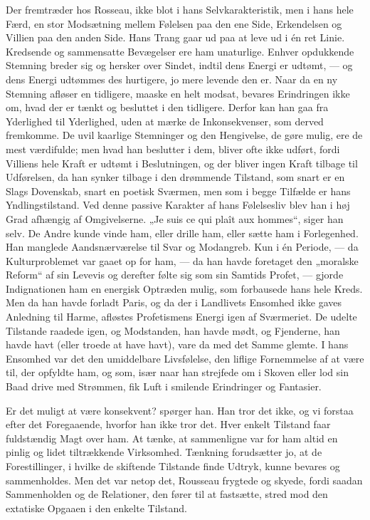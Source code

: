 \documentclass[12pt,a4paper,openany]{book}
\newcommand{\opage}[1]{\marginnote{\footnotesize\textit{[#1]}}}
\begin{document}
Der fremtræder hos Rosseau, ikke blot i hans Selvkarakteristik,
men i hans hele Færd, en stor Modsætning mellem
Følelsen paa den ene Side, Erkendelsen og Villien paa den
anden Side. Hans Trang gaar ud paa at leve ud i én ret
Linie. Kredsende og sammensatte Bevægelser ere ham unaturlige.
Enhver opdukkende Stemning breder sig og hersker over
Sindet, indtil dens Energi er udtømt, --- og dens Energi udtømmes
des hurtigere, jo mere levende den er. Naar da en ny
Stemning afløser en tidligere, maaske en helt modsat, bevares
Erindringen ikke om, hvad der er tænkt og besluttet i den tidligere.
Derfor kan han gaa fra Yderlighed til Yderlighed, uden
at mærke de Inkonsekvenser, som derved fremkomme. De uvil%
\setcounter{footnote}{0}%
\opage{143}kaarlige Stemninger og den Hengivelse, de gøre mulig, ere de
mest værdifulde; men hvad han beslutter i dem, bliver ofte ikke
udført, fordi Villiens hele Kraft er udtømt i Beslutningen, og
der bliver ingen Kraft tilbage til Udførelsen, da han synker tilbage
i den drømmende Tilstand, som snart er en Slags Dovenskab,
snart en poetisk Sværmen, men som i begge Tilfælde er
hans Yndlingstilstand. Ved denne passive Karakter af hans Følelsesliv
blev han i høj Grad afhængig af Omgivelserne. „Je
suis ce qui plaît aux hommes“, siger han selv. De Andre kunde
vinde ham, eller drille ham, eller sætte ham i Forlegenhed.
Han manglede Aandsnærværelse til Svar og Modangreb. Kun
i én Periode, --- da Kulturproblemet var gaaet op for ham, ---
da han havde foretaget den „moralske Reform“ af sin Levevis
og derefter følte sig som sin Samtids Profet, --- gjorde Indignationen
ham en energisk Optræden mulig, som forbausede hans
hele Kreds. Men da han havde forladt Paris, og da der i
Landlivets Ensomhed ikke gaves Anledning til Harme, afløstes
Profetismens Energi igen af Sværmeriet. De udelte Tilstande
raadede igen, og Modstanden, han havde mødt, og Fjenderne,
han havde havt (eller troede at have havt), vare da med det
Samme glemte. I hans Ensomhed var det den umiddelbare
Livsfølelse, den liflige Fornemmelse af at være til, der opfyldte
ham, og som, især naar han strejfede om i Skoven eller lod
sin Baad drive med Strømmen, fik Luft i smilende Erindringer
og Fantasier.

Er det muligt at være konsekvent? spørger han. Han tror
det ikke, og vi forstaa efter det Foregaaende, hvorfor han ikke
tror det. Hver enkelt Tilstand faar fuldstændig Magt over ham.
At tænke, at sammenligne var for ham altid en pinlig og lidet
tiltrækkende Virksomhed. Tænkning forudsætter jo, at de Forestillinger,
i hvilke de skiftende Tilstande finde Udtryk, kunne
bevares og sammenholdes. Men det var netop det, Rousseau
frygtede og skyede, fordi saadan Sammenholden og de Relationer,
den fører til at fastsætte, stred mod den extatiske Opgaaen i
den enkelte Tilstand.
\end{document}
